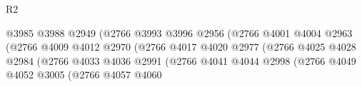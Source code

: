 \begin{lexlean}{R2}
\begin{coremodule}
                                                      @3985
                                                      @3988
                                                      @2949
                                                      (@2766
                                                        @3993
                                                        @3996
                                                        @2956
                                                        (@2766
                                                          @4001
                                                          @4004
                                                          @2963
                                                          (@2766
                                                            @4009
                                                            @4012
                                                            @2970
                                                            (@2766
                                                              @4017
                                                              @4020
                                                              @2977
                                                              (@2766
                                                                @4025
                                                                @4028
                                                                @2984
                                                                (@2766
                                                                  @4033
                                                                  @4036
                                                                  @2991
                                                                  (@2766
                                                                    @4041
                                                                    @4044
                                                                    @2998
                                                                    (@2766
                                                                      @4049
                                                                      @4052
                                                                      @3005
                                                                      (@2766
                                                                        @4057
                                                                        @4060

\end{coremodule}
\end{lexlean}
